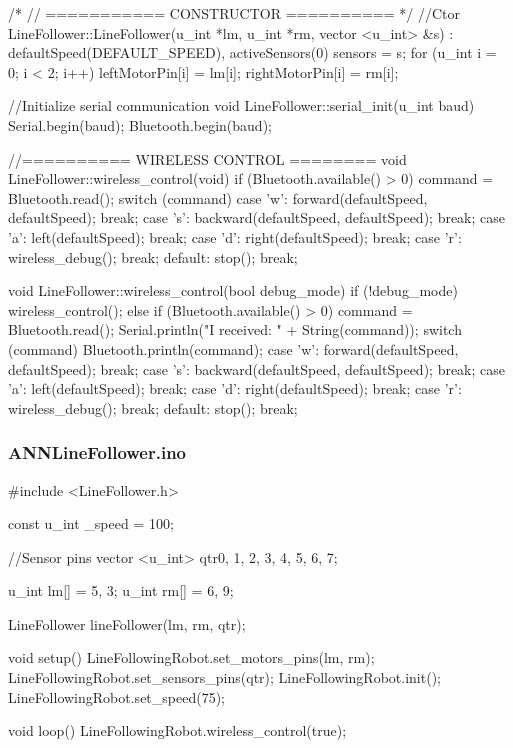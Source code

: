 \documentclass[14pt,a4paper]{extarticle}
\begin{document}
\begin{spverbatim}
/*
//  =========== CONSTRUCTOR ==========
*/
//Ctor
LineFollower::LineFollower(u_int *lm, u_int *rm, vector <u_int> &s)
: defaultSpeed(DEFAULT_SPEED),
  activeSensors(0) {
  sensors = s;
  for (u_int i = 0; i < 2; i++)
  {
    leftMotorPin[i] = lm[i];
    rightMotorPin[i] = rm[i];
  }
}

//Initialize serial communication
void LineFollower::serial_init(u_int baud)
{
  Serial.begin(baud);
  Bluetooth.begin(baud);
}

//========== WIRELESS CONTROL ========
void LineFollower::wireless_control(void)
{
  if (Bluetooth.available() > 0) 
  	command = Bluetooth.read();
  switch (command)
  {
    case 'w':
      forward(defaultSpeed, defaultSpeed);
      break;
    case 's':
      backward(defaultSpeed, defaultSpeed);
      break;
    case 'a':
      left(defaultSpeed);
      break;
    case 'd':
      right(defaultSpeed);
      break;
    case 'r':
      wireless_debug();
      break;
    default:
      stop();
      break;
  }
}

void LineFollower::wireless_control(bool debug_mode)
{
  if (!debug_mode) wireless_control();
  else
  {
    if (Bluetooth.available() > 0){
      command = Bluetooth.read();
      Serial.println("I received: " + String(command));
    }
    switch (command){
      Bluetooth.println(command);
      case 'w':
        forward(defaultSpeed, defaultSpeed);
        break;
      case 's':
        backward(defaultSpeed, defaultSpeed);
        break;
      case 'a':
        left(defaultSpeed);
        break;
      case 'd':
        right(defaultSpeed);
        break;
      case 'r':
        wireless_debug();
        break;
      default:
        stop();
        break;
    }
  }
}

	\end{spverbatim}
	
	\subsubsection{ANNLineFollower.ino}
	
	\begin{spverbatim}
#include <LineFollower.h>

const u_int _speed = 100;

//Sensor pins
vector <u_int> qtr{0, 1, 2, 3, 4, 5, 6, 7};

u_int lm[] = {5, 3};
u_int rm[] = {6, 9};

LineFollower lineFollower(lm, rm, qtr);

void setup()
{
  LineFollowingRobot.set_motors_pins(lm, rm);
  LineFollowingRobot.set_sensors_pins(qtr);
  LineFollowingRobot.init();
  LineFollowingRobot.set_speed(75);
}

void loop()
{
  LineFollowingRobot.wireless_control(true);
}
	\end{spverbatim}
\end{document}
